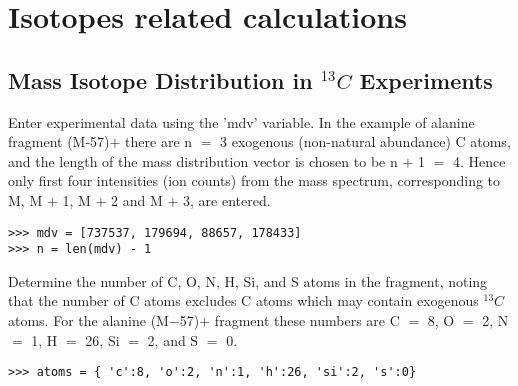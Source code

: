 

\chapter{Isotopes related calculations}

\section
{Mass Isotope Distribution in $^{13}C$ Experiments}


Enter experimental data using the 'mdv' variable. In the example of
alanine fragment (M-57)$+$ there are n $=$ 3 exogenous (non-natural
abundance) C atoms, and the length of the mass distribution vector
is chosen to be n $+$ 1 $=$ 4. Hence only first four intensities
(ion counts) from the mass spectrum, corresponding to M, M $+$ 1,
M $+$ 2 and M $+$ 3, are entered.

\begin{verbatim}
>>> mdv = [737537, 179694, 88657, 178433] 
>>> n = len(mdv) - 1
\end{verbatim}

Determine the number of C, O, N, H, Si, and S atoms in the fragment,
noting that the number of C atoms excludes C atoms which may contain
exogenous $^{13}C$ atoms. For the alanine (M$-$57)$+$ fragment
these numbers are C $=$ 8, O $=$ 2, N $=$ 1, H $=$ 26, Si $=$
2, and S $=$ 0.

\begin{verbatim} 
>>> atoms = { 'c':8, 'o':2, 'n':1, 'h':26, 'si':2, 's':0}
\end{verbatim}

